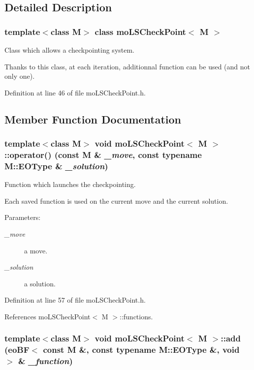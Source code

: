 \subsection{Detailed Description}
\subsubsection*{template$<$class M$>$ class mo\-LSCheck\-Point$<$ M $>$}

Class which allows a checkpointing system. 

Thanks to this class, at each iteration, additionnal function can be used (and not only one). 



Definition at line 46 of file mo\-LSCheck\-Point.h.

\subsection{Member Function Documentation}
\subsubsection{\setlength{\rightskip}{0pt plus 5cm}template$<$class M$>$ void {\bf mo\-LSCheck\-Point}$<$ M $>$::operator() (const M \& {\em \_\-move}, const typename M::EOType \& {\em \_\-solution})\hspace{0.3cm}{\tt  [inline]}}\label{classmo_l_s_check_point_a0}


Function which launches the checkpointing. 

Each saved function is used on the current move and the current solution.

\begin{Desc}
\item[Parameters:]
\begin{description}
\item[{\em \_\-move}]a move. \item[{\em \_\-solution}]a solution. \end{description}
\end{Desc}


Definition at line 57 of file mo\-LSCheck\-Point.h.

References mo\-LSCheck\-Point$<$ M $>$::functions.
\subsubsection{\setlength{\rightskip}{0pt plus 5cm}template$<$class M$>$ void {\bf mo\-LSCheck\-Point}$<$ M $>$::add ({\bf eo\-BF}$<$ const M \&, const typename M::EOType \&, void $>$ \& {\em \_\-function})\hspace{0.3cm}{\tt  [inline]}}\label{classmo_l_s_check_point_a1}


